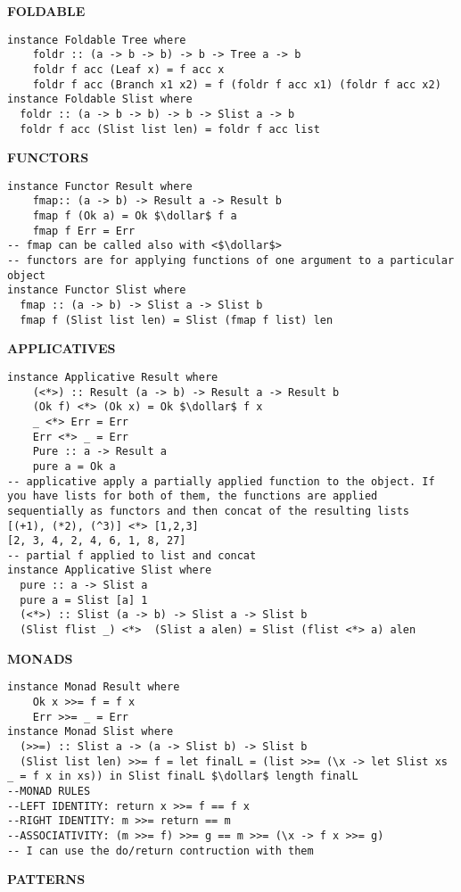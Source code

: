 \documentclass{article}
\newcommand{\dollar}{\mbox{\textdollar}}
\begin{document}
\begin{multicols*}{3}
\hrulefill

\textbf{FOLDABLE}
\begin{lstlisting}
instance Foldable Tree where
    foldr :: (a -> b -> b) -> b -> Tree a -> b
    foldr f acc (Leaf x) = f acc x
    foldr f acc (Branch x1 x2) = f (foldr f acc x1) (foldr f acc x2)
instance Foldable Slist where
  foldr :: (a -> b -> b) -> b -> Slist a -> b
  foldr f acc (Slist list len) = foldr f acc list
\end{lstlisting}

\hrulefill

\textbf{FUNCTORS}
\begin{lstlisting}
instance Functor Result where
    fmap:: (a -> b) -> Result a -> Result b
    fmap f (Ok a) = Ok $\dollar$ f a
    fmap f Err = Err
-- fmap can be called also with <$\dollar$>
-- functors are for applying functions of one argument to a particular object
instance Functor Slist where
  fmap :: (a -> b) -> Slist a -> Slist b
  fmap f (Slist list len) = Slist (fmap f list) len
\end{lstlisting}

\hrulefill

\textbf{APPLICATIVES}
\begin{lstlisting}
instance Applicative Result where
    (<*>) :: Result (a -> b) -> Result a -> Result b
    (Ok f) <*> (Ok x) = Ok $\dollar$ f x
    _ <*> Err = Err
    Err <*> _ = Err
    Pure :: a -> Result a
    pure a = Ok a
-- applicative apply a partially applied function to the object. If you have lists for both of them, the functions are applied sequentially as functors and then concat of the resulting lists
[(+1), (*2), (^3)] <*> [1,2,3]
[2, 3, 4, 2, 4, 6, 1, 8, 27]
-- partial f applied to list and concat
instance Applicative Slist where
  pure :: a -> Slist a
  pure a = Slist [a] 1
  (<*>) :: Slist (a -> b) -> Slist a -> Slist b
  (Slist flist _) <*>  (Slist a alen) = Slist (flist <*> a) alen
\end{lstlisting}

\hrulefill

\textbf{MONADS}
\begin{lstlisting}
instance Monad Result where
    Ok x >>= f = f x
    Err >>= _ = Err
instance Monad Slist where
  (>>=) :: Slist a -> (a -> Slist b) -> Slist b
  (Slist list len) >>= f = let finalL = (list >>= (\x -> let Slist xs _ = f x in xs)) in Slist finalL $\dollar$ length finalL
--MONAD RULES
--LEFT IDENTITY: return x >>= f == f x
--RIGHT IDENTITY: m >>= return == m
--ASSOCIATIVITY: (m >>= f) >>= g == m >>= (\x -> f x >>= g)
-- I can use the do/return contruction with them
\end{lstlisting}

\hrulefill

\textbf{PATTERNS}
\begin{lstlisting}
\end{lstlisting}

\end{multicols*}
\end{document}
